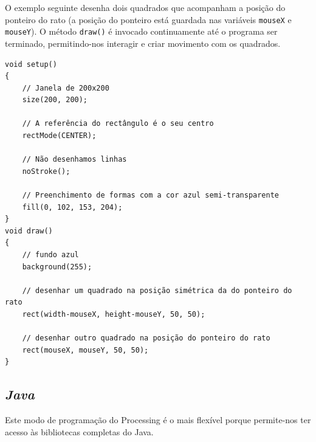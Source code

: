 O exemplo seguinte desenha dois quadrados que acompanham a posição do ponteiro do rato (a posição do ponteiro está guardada nas variáveis \texttt{mouseX} e \texttt{mouseY}). O método \texttt{draw()} é invocado continuamente até o programa ser terminado, permitindo-nos interagir e criar movimento com os quadrados.
\begin{lstlisting}
void setup()
{
    // Janela de 200x200
    size(200, 200);          
  
    // A referência do rectângulo é o seu centro
    rectMode(CENTER);        
    
    // Não desenhamos linhas
    noStroke();              
  
    // Preenchimento de formas com a cor azul semi-transparente  
    fill(0, 102, 153, 204);  
}
void draw()
{
    // fundo azul
    background(255);                           

    // desenhar um quadrado na posição simétrica da do ponteiro do rato
    rect(width-mouseX, height-mouseY, 50, 50); 
  
    // desenhar outro quadrado na posição do ponteiro do rato
    rect(mouseX, mouseY, 50, 50);
}
\end{lstlisting}

\subsection{\emph{Java}}
Este modo de programação do Processing é o mais flexível porque permite-nos ter acesso às bibliotecas completas do Java.




